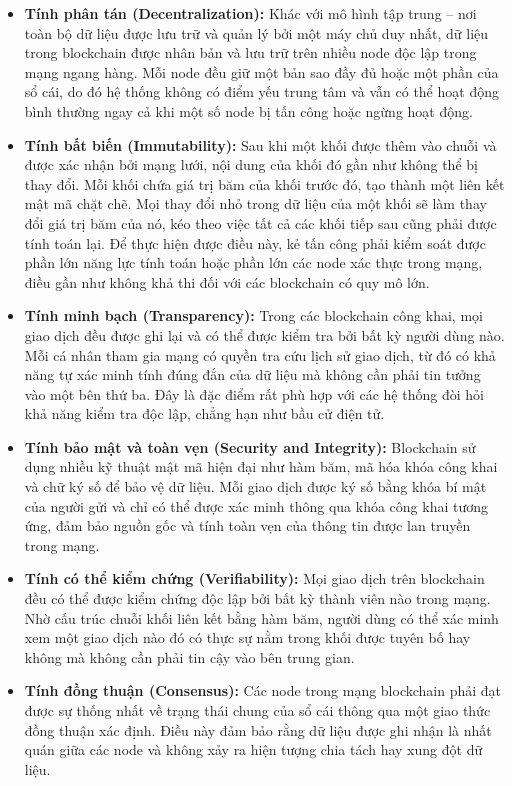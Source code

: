 \begin{itemize}
    \item \textbf{Tính phân tán (Decentralization):} Khác với mô hình tập trung -- nơi toàn bộ dữ liệu được lưu trữ và quản lý bởi một máy chủ duy nhất, dữ liệu trong blockchain được nhân bản và lưu trữ trên nhiều node độc lập trong mạng ngang hàng. Mỗi node đều giữ một bản sao đầy đủ hoặc một phần của sổ cái, do đó hệ thống không có điểm yếu trung tâm và vẫn có thể hoạt động bình thường ngay cả khi một số node bị tấn công hoặc ngừng hoạt động.

    \item \textbf{Tính bất biến (Immutability):} Sau khi một khối được thêm vào chuỗi và được xác nhận bởi mạng lưới, nội dung của khối đó gần như không thể bị thay đổi. Mỗi khối chứa giá trị băm của khối trước đó, tạo thành một liên kết mật mã chặt chẽ. Mọi thay đổi nhỏ trong dữ liệu của một khối sẽ làm thay đổi giá trị băm của nó, kéo theo việc tất cả các khối tiếp sau cũng phải được tính toán lại. Để thực hiện được điều này, kẻ tấn công phải kiểm soát được phần lớn năng lực tính toán hoặc phần lớn các node xác thực trong mạng, điều gần như không khả thi đối với các blockchain có quy mô lớn.

    \item \textbf{Tính minh bạch (Transparency):} Trong các blockchain công khai, mọi giao dịch đều được ghi lại và có thể được kiểm tra bởi bất kỳ người dùng nào. Mỗi cá nhân tham gia mạng có quyền tra cứu lịch sử giao dịch, từ đó có khả năng tự xác minh tính đúng đắn của dữ liệu mà không cần phải tin tưởng vào một bên thứ ba. Đây là đặc điểm rất phù hợp với các hệ thống đòi hỏi khả năng kiểm tra độc lập, chẳng hạn như bầu cử điện tử.

    \item \textbf{Tính bảo mật và toàn vẹn (Security and Integrity):} Blockchain sử dụng nhiều kỹ thuật mật mã hiện đại như hàm băm, mã hóa khóa công khai và chữ ký số để bảo vệ dữ liệu. Mỗi giao dịch được ký số bằng khóa bí mật của người gửi và chỉ có thể được xác minh thông qua khóa công khai tương ứng, đảm bảo nguồn gốc và tính toàn vẹn của thông tin được lan truyền trong mạng.

    \item \textbf{Tính có thể kiểm chứng (Verifiability):} Mọi giao dịch trên blockchain đều có thể được kiểm chứng độc lập bởi bất kỳ thành viên nào trong mạng. Nhờ cấu trúc chuỗi khối liên kết bằng hàm băm, người dùng có thể xác minh xem một giao dịch nào đó có thực sự nằm trong khối được tuyên bố hay không mà không cần phải tin cậy vào bên trung gian.

    \item \textbf{Tính đồng thuận (Consensus):} Các node trong mạng blockchain phải đạt được sự thống nhất về trạng thái chung của sổ cái thông qua một giao thức đồng thuận xác định. Điều này đảm bảo rằng dữ liệu được ghi nhận là nhất quán giữa các node và không xảy ra hiện tượng chia tách hay xung đột dữ liệu.
\end{itemize}

